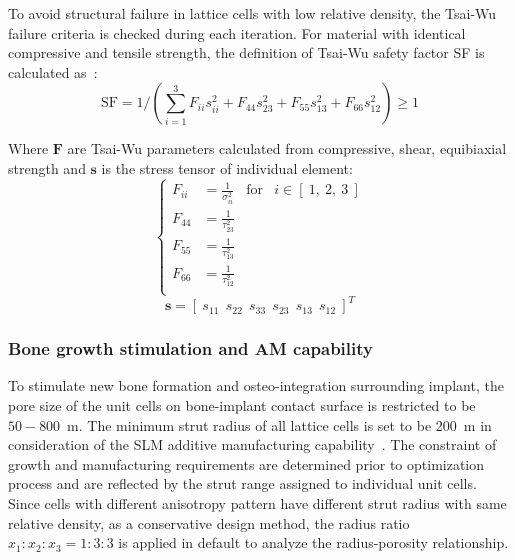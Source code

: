 \documentclass[12pt]{extbook}
\begin{document}
To avoid structural failure in lattice cells with low relative density, the Tsai-Wu failure criteria is checked during each iteration. For material with identical compressive and tensile strength, the definition of Tsai-Wu safety factor SF is calculated as~\cite{tsai1971general}:
\begin{equation}
\text{SF} = 1 / (\sum_{i=1}^{3}F_{ii}s_{ii}^2 + F_{44}s_{23}^2 + F_{55}s_{13}^2 + F_{66}s_{12}^2)  \geq 1
\label{3-2-2}
\end{equation}

Where $\bm{F}$ are Tsai-Wu parameters calculated from compressive, shear, equibiaxial strength and $\bm{s}$ is the stress tensor of individual element:
\begin{equation}
\left\{
\begin{array}{llll}
F_{ii} & = \frac{1}{{\sigma}^2_{ii}} & \text{for} & i \in [~1,~2,~3~]\\
F_{44} & = \frac{1}{{\tau}_{23}^2} & &  \\
F_{55} & = \frac{1}{{\tau}_{13}^2} & & \\
F_{66} & = \frac{1}{{\tau}_{12}^2} & & \\
\end{array}
\right.
\label{2-1-20}
\end{equation}
\begin{equation}
\bm{s} = [~s_{11} ~~ s_{22} ~~ s_{33} ~~ s_{23} ~~ s_{13} ~~ s_{12}~]^T
\label{3-2-3}
\end{equation}

\subsubsection{Bone growth stimulation and AM capability}

To stimulate new bone formation and osteo-integration surrounding implant, the pore size of the unit cells on bone-implant contact surface is restricted to be $50 - 800$~{\textmu}m\cite{harrysson2008direct}. The minimum strut radius of all lattice cells is set to be 200~{\textmu}m in consideration of the SLM additive manufacturing capability~\cite{de2013bone}. The constraint of growth and manufacturing requirements are determined prior to optimization process and are reflected by the strut range assigned to individual unit cells. Since cells with different anisotropy pattern have different strut radius with same relative density, as a conservative design method, the radius ratio $x_1:x_2:x_3  = 1:3:3$ is applied in default to analyze the radius-porosity relationship.\\
\end{document}
